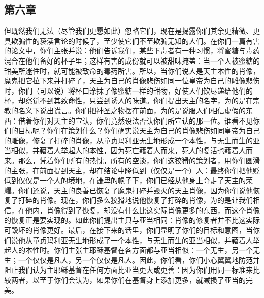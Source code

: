 
\subsection{第六章}

\par

但既然我们无法（尽管我们更愿如此）忽略它们，现在是揭露你们其余更精微、更具欺骗性的亵渎言论的时候了，至少使它们不至欺骗无知的人们。在你们一篇有害的论文中，你们主张并说：他们告诉我们，某些下毒者有一种习惯，将蜜糖与毒药混合在他们备好的杯子里；这样有害的成份就可以被甜味掩盖：当一个人被蜜糖的甜美所迷住时，就可能被致命的毒药所害。所以，当你们说人是天主本性的肖像，魔鬼把它拉下来并打碎了，天主为自己的肖像悲伤如同一位皇帝为自己的雕像悲伤时，你们（可以说）将杯口涂抹了像蜜糖一样的甜物，好使人们饮尽递给他们的杯，却察觉不到其致命性，只尝到诱人的味道。你们提出天主的名字，为的是在宗教的名义下说出谎言。你们把神圣之物摆在前面，为的是说服人们相信虚假的东西：借着你们对天主的宣认，你们竟然设法否认你们所宣认的那一位。谁看不见你们的目标呢？你们在策划什么？你们确实说天主为自己的肖像悲伤如同皇帝为自己的雕像，修复了打碎的肖像，从童贞玛利亚无生地形成一个本性，与无生而生的亚当相似，并藉着人举起人的本性，因为死亡藉着人而来，死人的复活也藉着人而来。那么，凭着你们所有的热忱，所有的空谈，你们这狡猾的策划者，用你们圆滑的主张，在前面提到天主，却在结论中降低到（仅仅是一个）人：最终你们把他贬低到仅仅是一个人的境地，在谦卑的幌子下，你们已经从他身上夺走了天主的荣耀。你们还说，天主的良善已恢复了魔鬼打碎并毁灭的天主肖像，因为你们说他恢复了打碎的肖像。现在，你们多么狡猾地说他恢复了打碎的肖像，为的是让我们相信，在他内，肖像得到了恢复，却没有什么比这实际肖像更多的东西，而这个肖像的恢复正是要实现的。如此你们提出主只与亚当相同：肖像的修复者并不比这实际可毁坏的肖像更好。最后，在接下来的话里，你们显明了你们的目标和意图，当你们说他从童贞玛利亚无生地形成了一个本性，与无生而生的亚当相似，并藉着人举起人的本性时。你们主张主耶稣基督在各方面都与亚当相似：一个无生，另一个无生；一个仅仅是凡人，另一个仅仅是凡人。因此，你们看，你们小心翼翼地防范并阻止我们认为主耶稣基督在任何方面比亚当更大或更善：因为你们用同一标准来比较两者，以至于你们会认为，如果你们在基督身上添加更多，就减损了亚当的完美。\par


